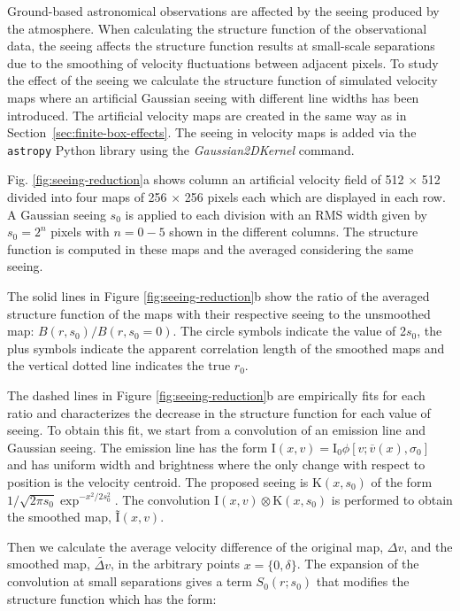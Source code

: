 \documentclass[fleqn,usenatbib, useAMS, a4paper]{mnras}
\begin{document}
Ground-based astronomical observations are affected by the seeing produced by the atmosphere.
When calculating the structure function of the observational data, the seeing affects the structure function results at small-scale separations due to the smoothing of velocity fluctuations between adjacent pixels.
To study the effect of the seeing we calculate the structure function of simulated velocity maps where an artificial Gaussian seeing with different line widths has been introduced.
The artificial velocity maps are created in the same way as in Section~\ref{sec:finite-box-effects}.
The seeing in velocity maps is added via the \texttt{astropy} Python library \citep{astropy:2013} using the \textit{Gaussian2DKernel} command. 

Fig. \ref{fig:seeing-reduction}a shows column an artificial velocity field of 512 \(\times\) 512  divided into four maps of 256 \(\times \) 256 pixels each which are displayed in each row.
A Gaussian seeing \(s_0 \) is applied to each division with an RMS width given by \(s_0 = 2^n\) pixels with \(n = 0-5\) shown in the different columns. 
The structure function is computed in these maps and the averaged considering the same seeing. 

The solid lines in Figure \ref{fig:seeing-reduction}b show the ratio of the averaged structure function of the maps with their respective seeing to the unsmoothed map: \(B (r, s_0 ) / B (r, s_0 = 0) \).
The circle symbols indicate the value of 2\(s_0\), the plus symbols indicate the apparent correlation length of the smoothed maps and the vertical dotted line indicates the true \(r_{0}\). 

The dashed lines in Figure \ref{fig:seeing-reduction}b are  empirically fits for each ratio and characterizes the decrease in the structure function for each value of seeing.
To obtain this fit, we start from a convolution of an emission line and Gaussian seeing.
The emission line has the form \(\text {I}(x, v) = \text{I}_0 \phi [v; \overline {v} (x), \sigma_0]\) and has uniform width and brightness where the only change with respect to position is the velocity centroid.
The proposed seeing is \(\text{K}(x, s_0)\) of the form \(1 / \sqrt{2 \pi s_0} \exp^ {-x^ 2 / 2s_0 ^ 2} \).
The convolution \(\text{I}(x, v) \otimes \text{K}(x, s_0) \) is performed to obtain the smoothed map, \(\text {\~I} (x, v) \). 

Then we calculate the average velocity difference of the original map, \(\Delta v \), and the smoothed map, \(\tilde{\Delta v}\), in the arbitrary points \( x = \{0, \delta \} \).
The expansion of the convolution at small separations gives a term \(S_0(r; s_0)\) that modifies the structure function which has the form: 
\end{document}
